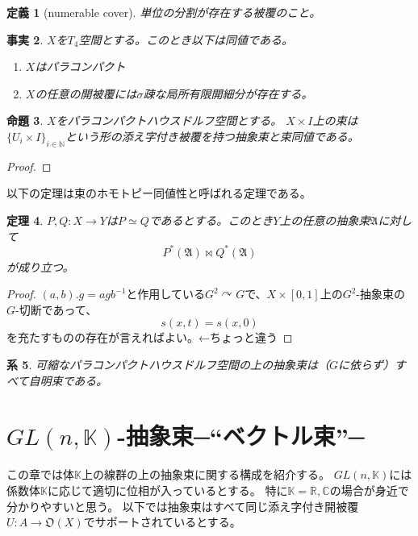 \documentclass[leqno]{jsarticle}
\newtheorem{thm}{定理}
\newtheorem{prop}[thm]{命題}
\newtheorem{cor}[thm]{系}
\newtheorem{df}[thm]{定義}
\newtheorem{fact}[thm]{事実}
\newcommand{\nn}{\mathbb{N}}
\newcommand{\rr}{\mathbb{R}}
\newcommand{\cc}{\mathbb{C}}
\begin{document}
\begin{df}[numerable cover]
単位の分割が存在する被覆のこと。
\end{df}




\begin{fact}
$X$を$T_4$空間とする。このとき以下は同値である。
\begin{enumerate}
\item $X$はパラコンパクト
\item $X$の任意の開被覆には$\sigma$疎な局所有限開細分が存在する。
\end{enumerate}
\end{fact}

\begin{prop}
$X$をパラコンパクトハウスドルフ空間とする。
$X\times I$上の束は$\{U_i\times I\}_{i\in\nn}$という形の添え字付き被覆を持つ抽象束と束同値である。
\end{prop}
\begin{proof}

\end{proof}

以下の定理は束のホモトピー同値性と呼ばれる定理である。
\begin{thm}
$P,Q:X\to Y$は$P\simeq Q$であるとする。このとき$Y$上の任意の抽象束$\mathfrak{A}$に対して
\[
P^*(\mathfrak{A})\bowtie Q^*(\mathfrak{A})
\]
が成り立つ。
\end{thm}
\begin{proof}
$(a,b).g=agb^{-1}$と作用している$G^2\curvearrowright G$で、$X\times [0,1]$上の$G^2$-抽象束の$G$-切断であって、
\[
s(x,t)=s(x,0)
\]
を充たすものの存在が言えればよい。←ちょっと違う
\end{proof}
\begin{cor}
可縮なパラコンパクトハウスドルフ空間の上の抽象束は（$G$に依らず）すべて自明束である。
\end{cor}


\section{$GL(n, \mathbb{K})$-抽象束─``ベクトル束''─}

この章では体$\mathbb{K}$上の線群の上の抽象束に関する構成を紹介する。
$GL(n, \mathbb{K})$には係数体$\mathbb{K}$に応じて適切に位相が入っているとする。
特に$\mathbb{K}=\rr, \cc$の場合が身近で分かりやすいと思う。
以下では抽象束はすべて同じ添え字付き開被覆$U:A\to \mathfrak{O}(X)$でサポートされているとする。
\end{document}
